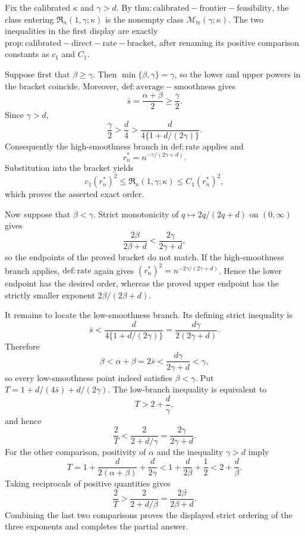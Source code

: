 Fix the calibrated \(\kappa\) and \(\gamma>d\). By \(\mathrm{thm:calibrated-frontier-feasibility}\), the class entering \(\mathfrak R_n(1,\gamma;\kappa)\) is the nonempty class \(\mathcal M_{\mathrm{tr}}(\gamma;\kappa)\). The two inequalities in the first display are exactly \(\mathrm{prop:calibrated-direct-rate-bracket}\), after renaming its positive comparison constants as \(c_1\) and \(C_1\).

Suppose first that \(\beta\ge\gamma\). Then \(\min\{\beta,\gamma\}=\gamma\), so the lower and upper powers in the bracket coincide. Moreover, \(\mathrm{def:average-smoothness}\) gives
\[
 \bar s=\frac{\alpha+\beta}{2}\ge\frac{\gamma}{2}.
\]
Since \(\gamma>d\),
\[
 \frac{\gamma}{2}>\frac d4>
 \frac{d}{4\{1+d/(2\gamma)\}}.
\]
Consequently the high-smoothness branch in \(\mathrm{def:rate}\) applies and
\[
 r_n^*=n^{-\gamma/(2\gamma+d)}.
\]
Substitution into the bracket yields
\[
 c_1(r_n^*)^2
 \le \mathfrak R_n(1,\gamma;\kappa)
 \le C_1(r_n^*)^2,
\]
which proves the asserted exact order.

Now suppose that \(\beta<\gamma\). Strict monotonicity of \(q\mapsto 2q/(2q+d)\) on \((0,\infty)\) gives
\[
 \frac{2\beta}{2\beta+d}<
 \frac{2\gamma}{2\gamma+d},
\]
so the endpoints of the proved bracket do not match. If the high-smoothness branch applies, \(\mathrm{def:rate}\) again gives \((r_n^*)^2=n^{-2\gamma/(2\gamma+d)}\). Hence the lower endpoint has the desired order, whereas the proved upper endpoint has the strictly smaller exponent \(2\beta/(2\beta+d)\).

It remains to locate the low-smoothness branch. Its defining strict inequality is
\[
 \bar s<\frac{d}{4\{1+d/(2\gamma)\}}
 =\frac{d\gamma}{2(2\gamma+d)}.
\]
Therefore
\[
 \beta<\alpha+\beta=2\bar s
 <\frac{d\gamma}{2\gamma+d}<\gamma,
\]
so every low-smoothness point indeed satisfies \(\beta<\gamma\). Put \(T=1+d/(4\bar s)+d/(2\gamma)\). The low-branch inequality is equivalent to
\[
 T>2+\frac d\gamma,
\]
and hence
\[
 \frac{2}{T}<\frac{2}{2+d/\gamma}
 =\frac{2\gamma}{2\gamma+d}.
\]
For the other comparison, positivity of \(\alpha\) and the inequality \(\gamma>d\) imply
\[
 T
 =1+\frac{d}{2(\alpha+\beta)}+\frac{d}{2\gamma}
 <1+\frac{d}{2\beta}+\frac12
 <2+\frac d\beta.
\]
Taking reciprocals of positive quantities gives
\[
 \frac{2}{T}>\frac{2}{2+d/\beta}
 =\frac{2\beta}{2\beta+d}.
\]
Combining the last two comparisons proves the displayed strict ordering of the three exponents and completes the partial answer.